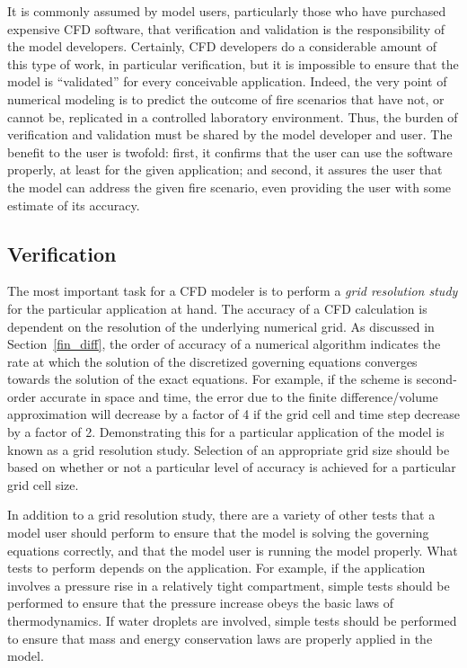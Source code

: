 \documentclass[graybox]{svmult}
\begin{document}
It is commonly assumed by model users, particularly those who have purchased expensive CFD software, that verification and validation is the responsibility of the model developers. Certainly, CFD developers do a considerable amount of this type of work, in particular verification, but it is impossible to ensure that the model is ``validated'' for every conceivable application. Indeed, the very point of numerical modeling is to predict the outcome of fire scenarios that have not, or cannot be, replicated in a controlled laboratory environment. Thus, the burden of verification and validation must be shared by the model developer and user. The benefit to the user is twofold: first, it confirms that the user can use the software properly, at least for the given application; and second, it assures the user that the model can address the given fire scenario, even providing the user with some estimate of its accuracy.

\subsection{Verification}

The most important task for a CFD modeler is to perform a {\em grid resolution study} for the particular application at hand. The accuracy of a CFD calculation is dependent on the resolution of the underlying numerical grid. As discussed in Section~\ref{fin_diff}, the order of accuracy of a numerical algorithm indicates the rate at which the solution of the discretized governing equations converges towards the solution of the exact equations. For example, if the scheme is second-order accurate in space and time, the error due to the finite difference/volume approximation will decrease by a factor of 4 if the grid cell and time step decrease by a factor of 2. Demonstrating this for a particular application of the model is known as a grid resolution study. Selection of an appropriate grid size should be based on whether or not a particular level of accuracy is achieved for a particular grid cell size.

In addition to a grid resolution study, there are a variety of other tests that a model user should perform to ensure that the model is solving the governing equations correctly, and that the model user is running the model properly. What tests to perform depends on the application. For example, if the application involves a pressure rise in a relatively tight compartment, simple tests should be performed to ensure that the pressure increase obeys the basic laws of thermodynamics. If water droplets are involved, simple tests should be performed to ensure that mass and energy conservation laws are properly applied in the model.
\end{document}
